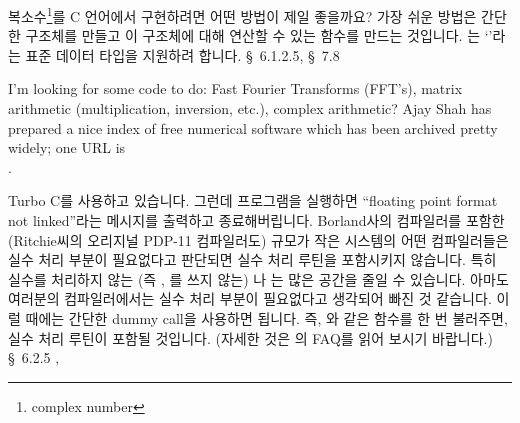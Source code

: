 \begin{faq}
	복소수\footnote{complex number}를 C 언어에서 구현하려면
	어떤 방법이 제일 좋을까요?
\A
	가장 쉬운 방법은 간단한 구조체를 만들고 이 구조체에 대해 연산할 수
	있는 함수를 만드는 것입니다.  \cite{c9x}는 `'라는 표준 데이터
	타입을 지원하려 합니다.  
\R
	\cite{c9x} \S\ 6.1.2.5, \S\ 7.8
\end{faq}

\begin{faq}
	I'm looking for some code to do:
	Fast Fourier Transforms (FFT's),
	matrix arithmetic (multiplication, inversion, etc.),
	complex arithmetic?
\A
	Ajay Shah has prepared a nice index of free numerical
	software which has been archived pretty widely; one URL
	is \\ .
	
        \noindent {}
\end{faq}

\begin{faq}
	Turbo C를 사용하고 있습니다.  그런데 프로그램을 실행하면
	``floating point format not linked''라는 메시지를 출력하고
	종료해버립니다.
\A
	Borland사의 컴파일러를 포함한 (Ritchie씨의 오리지널 PDP-11 컴파일러도)
	규모가 작은 시스템의 어떤 컴파일러들은 실수 처리 부분이 필요없다고
	판단되면 실수 처리 루틴을 포함시키지 않습니다.
	특히 실수를 처리하지 않는 (즉 , 를
	쓰지 않는) 나 는 많은 공간을 줄일 수 있습니다.
	아마도 여러분의 컴파일러에서는 실수 처리 부분이 필요없다고 생각되어
	빠진 것 같습니다.  이럴 때에는 간단한 dummy call을 사용하면 됩니다.
	즉, 와 같은 함수를 한 번 불러주면, 실수 처리 루틴이
	포함될 것입니다.  (자세한 것은 의
	FAQ를 읽어 보시기 바랍니다.)
\R
	\cite{hs5} \S\ 6.2.5 , 
\end{faq}

%
%
